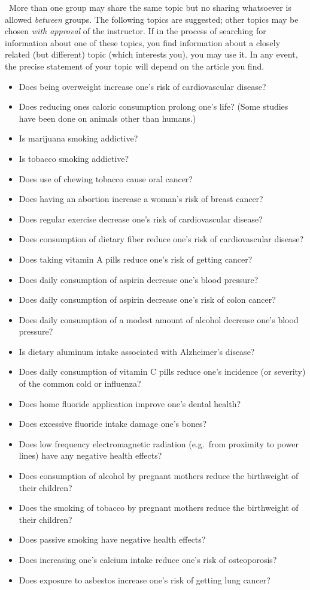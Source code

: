 \par{}\ More than one group may share the same topic but
no sharing whatsoever is allowed {\it between\/} groups.  The following
topics
are suggested; other topics may be chosen {\it with approval\/} of the
instructor.  If in the process of searching for information about
one of these topics, you find information about a closely related
(but different) topic (which interests you), you may use it.  In any event,
the precise statement of your topic will depend on the article you find.
\begin{itemize}
\item Does being overweight increase one's risk of cardiovascular disease?
\item Does reducing ones caloric consumption prolong one's life?  (Some
studies
      have been done on animals other than humans.)
\item Is marijuana smoking addictive?
\item Is tobacco smoking addictive?
\item Does use of chewing tobacco cause oral cancer?
\item Does having an abortion increase a woman's risk of breast cancer?
\item Does regular exercise decrease one's risk of cardiovascular disease?
\item Does consumption of dietary fiber reduce one's risk of cardiovascular
      disease?
\item Does taking vitamin A pills reduce one's risk of getting cancer?
\item Does daily consumption of aspirin decrease one's blood pressure?
\item Does daily consumption of aspirin decrease one's risk of colon cancer?
\item Does daily consumption of a modest amount of alcohol decrease one's
      blood pressure?
\item Is dietary aluminum intake associated with Alzheimer's disease?
\item Does daily consumption of vitamin C pills reduce one's incidence (or
      severity) of the common cold or influenza?
\item Does home fluoride application improve one's dental health?
\item Does excessive fluoride intake damage one's bones?
\item Does low frequency electromagnetic radiation (e.g.\ from proximity to
      power lines) have any negative health effects?
\item Does consumption of alcohol by pregnant mothers reduce the birthweight
      of their children?
\item Does the smoking of tobacco by pregnant mothers reduce the birthweight
      of their children?
\item Does passive smoking have negative health effects?
\item Does increasing one's calcium intake reduce one's risk of
osteoporosis?
\item Does exposure to asbestos increase one's risk of getting lung cancer?
\end{itemize}

